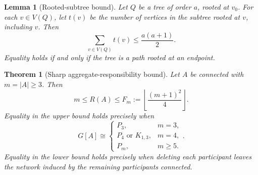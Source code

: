 \documentclass[10pt,a4paper]{amsart}
\newtheorem{theorem}{Theorem}
\newtheorem{lemma}{Lemma}
\begin{document}
\begin{lemma}[Rooted-subtree bound]
\label{lem:branch}
Let \(Q\) be a tree of order \(a\), rooted at \(v_0\). For each
\(v\in V(Q)\), let \(t(v)\) be the number of vertices in the subtree rooted at
\(v\), including \(v\). Then
\[
 \sum_{v\in V(Q)}t(v)\leq\frac{a(a+1)}2.
\]
Equality holds if and only if the tree is a path rooted at an endpoint.
\end{lemma}

\begin{theorem}[Sharp aggregate-responsibility bound]
\label{thm:graph-bound}
Let \(A\) be connected with \(m=|A|\geq3\). Then
\begin{equation}
 m\leq R(A)\leq
 F_m:=\left\lfloor\frac{(m+1)^2}{4}\right\rfloor.
 \label{eq:R-bound}
\end{equation}
Equality in the upper bound holds precisely when
\[
 G[A]\cong
 \begin{cases}
 P_3,&m=3,\\
 P_4\text{ or }K_{1,3},&m=4,\\
 P_m,&m\geq5.
 \end{cases}.
\]
Equality in the lower bound holds precisely when deleting each participant
leaves the network induced by the remaining participants connected.
\end{theorem}
\end{document}

